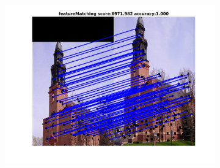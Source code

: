 \documentclass[
	fontsize=12pt,
	paper=a4,
	twoside=false,
	numbers=noenddot,
	plainheadsepline,
	toc=listof,
	toc=bibliography
]{scrartcl}
\begin{document}
\begin{figure}[h]
\begin{subfigure}[b]{0.33\textwidth}
		\includegraphics[scale=0.25]{"fig_ver2608/RealImages/ImgTrafo/no_descr/using_cpd_afftrafo/fi_2_featureMatching"} 
	\end{subfigure} 	


\end{figure}
\end{document}
